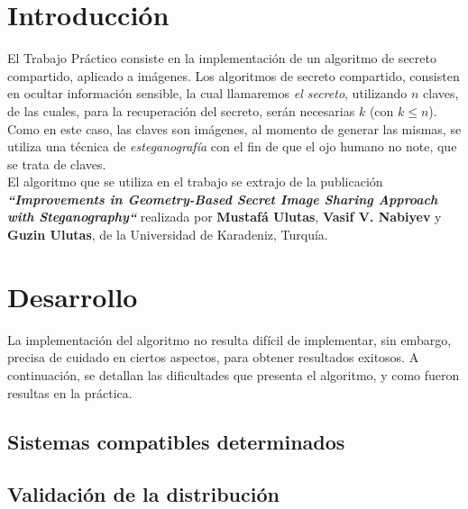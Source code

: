 \documentclass{article}
\begin{document}
\section{Introducción}

El Trabajo Práctico consiste en la implementación de un algoritmo de secreto compartido, aplicado a imágenes. Los algoritmos
de secreto compartido, consisten en ocultar información sensible, la cual llamaremos \emph{el secreto}, utilizando $n$ claves, de las cuales, para la
recuperación del secreto, serán necesarias $k$ (con $k \le n$).\\

Como en este caso, las claves son imágenes, al momento de generar las mismas, se utiliza una técnica de \emph{esteganografía} con el fin
de que el ojo humano no note, que se trata de claves.\\

El algoritmo que se utiliza en el trabajo se extrajo de la publicación \textbf{\emph{``Improvements in Geometry-Based Secret Image Sharing Approach
with Steganography``}} realizada por \textbf{Mustafá Ulutas}, \textbf{Vasif V. Nabiyev} y \textbf{Guzin Ulutas}, de la Universidad de Karadeniz, Turquía.

\section{Desarrollo}

La implementación del algoritmo no resulta difícil de implementar, sin embargo, precisa de cuidado en ciertos aspectos, para obtener resultados
exitosos. A continuación, se detallan las dificultades que presenta el algoritmo, y como fueron resultas en la práctica.

\subsection{Sistemas compatibles determinados}

\subsection{Validación de la distribución}
\end{document}
